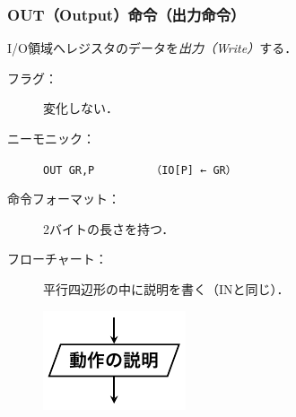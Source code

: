 \documentclass[handout]{beamer}        %
\begin{document}
\begin{frame}
  \frametitle{OUT（Output）命令（出力命令）}
  I/O領域へレジスタのデータを\emph{出力（Write）}する．
  \vfill
  \begin{description}
  \item[フラグ：] 変化しない．
    \vfill
  \item[ニーモニック：]\texttt{OUT GR,P}~~~~~~~~~\texttt{（IO[P] ← GR）}
    \vfill
  \item[命令フォーマット：] 2バイトの長さを持つ．\\
    {\small{}}
    \vfill
  \item[フローチャート：] 平行四辺形の中に説明を書く（INと同じ）．\\
    \centerline{\includegraphics[scale=0.8]{../Tikz/in.pdf}}
    \vfill
  \end{description}
  \vfill
\end{frame}
\end{document}
